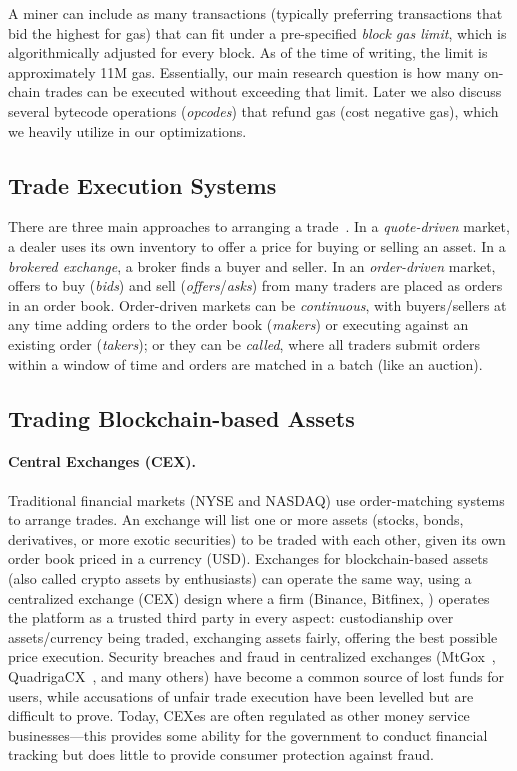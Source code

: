 A miner can include as many transactions (typically preferring transactions that bid the highest for gas) that can fit under a pre-specified \textit{block gas limit}, which is algorithmically adjusted for every block. As of the time of writing, the limit is approximately 11M gas. Essentially, our main research question is how many on-chain trades can be executed without exceeding that limit. Later we also discuss several bytecode operations (\emph{opcodes}) that refund gas (\ie cost negative gas), which we heavily utilize in our optimizations.

\subsection{Trade Execution Systems}

 There are three main approaches to arranging a trade~\cite{Har03}. In a \emph{quote-driven} market, a dealer uses its own inventory to offer a price for buying or selling an asset. In a \emph{brokered exchange}, a broker finds a buyer and seller. In an \emph{order-driven} market, offers to buy (\emph{bids}) and sell (\emph{offers}/\emph{asks}) from many traders are placed as orders in an order book. Order-driven markets can be \emph{continuous}, with buyers/sellers at any time adding orders to the order book (\emph{makers}) or executing against an existing order (\emph{takers}); or they can be \emph{called}, where all traders submit orders within a window of time and orders are matched in a batch (like an auction). 

\subsection{Trading Blockchain-based Assets}

%

\paragraph{Central Exchanges (CEX).} Traditional financial markets (\eg NYSE and NASDAQ) use order-matching systems to arrange trades. An exchange will list one or more assets (stocks, bonds, derivatives, or more exotic securities) to be traded with each other, given its own order book priced in a currency (\eg USD). Exchanges for blockchain-based assets (also called crypto assets by enthusiasts) can operate the same way, using a centralized exchange (CEX) design where a firm (\eg Binance, Bitfinex, \etc) operates the platform as a trusted third party in every aspect: custodianship over assets/currency being traded, exchanging assets fairly, offering the best possible price execution. Security breaches and fraud in centralized exchanges  (\eg MtGox~\cite{TheHisto45:online}, QuadrigaCX~\cite{SEBIOrde83:online}, and many others) have become a common source of lost funds for users, while accusations of unfair trade execution have been levelled but are difficult to prove. Today, CEXes are often regulated as other money service businesses---this provides some ability for the government to conduct financial tracking but does little to provide consumer protection against fraud. 

